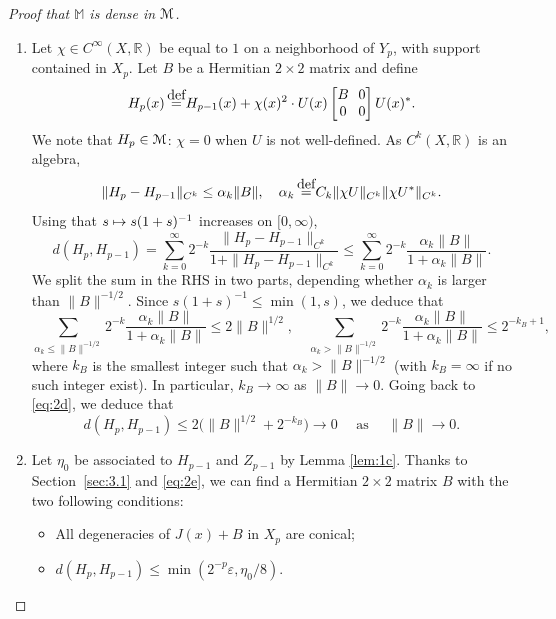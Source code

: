 \documentclass[11pt]{article}
\numberwithin{equation}{section}
\let\pazocal\EuScript
\def\mto{\mathchoice{\longmapsto}{\mapsto}{\mapsto}{\mapsto}}
\theoremstyle{definition}
\newcommand{\MM}{\pazocal{M}}
\newcommand{\R}{\mathbb{R}}
\newcommand{\Mm}{\mathbb{M}}
\let\az\alpha
\let\epsi\varepsilon
\newcommand{\matrice}[1]{\arraycolsep3.5pt\begin{bmatrix}#1\end{bmatrix}}
\newcommand{\de}{\,\mathrel{\stackrel{\makebox[0pt]{\mbox{\normalfont\tiny def}}}{=}}}
\begin{document}
\begin{proof}[Proof that $\Mm$ is dense in $\MM$]
\begin{enumerate}
\item
Let $\chi \in C^\infty(X,\R)$ be equal to $1$ on a neighborhood of $Y_p$, with support contained in $X_p$. Let $B$ be a Hermitian $2 \times 2$ matrix and define
\begin{equation}\label{eq:1r}
H_p(x) \de H_{p-1}(x) + \chi(x)^2 \cdot U(x) \matrice{ B & 0 \\ 0 & 0}U(x)^*.
\end{equation}
We note that
$H_p \in \MM$: $\chi = 0$ when $U$ is not well-defined. As $C^k(X,\R)$ is an algebra,
\begin{equation*}
\| H_p-H_{p-1} \|_{C^k} \leq \az_k \|B\|, \quad \az_k \de C_k \| \chi U \|_{C^k} \| \chi U^* \|_{C^k}.
\end{equation*}
Using that $s \mto s(1+s)^{-1}$ increases on $[0,\infty)$,
\begin{equation}\label{eq:2d}
d(H_p,H_{p-1}) = \sum_{k=0}^\infty 2^{-k} \dfrac{\| H_p-H_{p-1} \|_{C^k} }{1+\| H_p - H_{p-1}\|_{C^k}} \leq \sum_{k=0}^\infty 2^{-k} \dfrac{\az_k \|B\| }{1+\az_k \|B\|}.
\end{equation}
We split the sum in the RHS in two parts, depending whether $\az_k$ is larger than $\|B\|^{-1/2}$. Since $s(1+s)^{-1} \leq \min(1,s)$, we deduce that
\begin{equation*}
\sum_{\az_k \leq \|B\|^{-1/2} } 2^{-k} \dfrac{\az_k \|B\| }{1+\az_k \|B\|} \leq 2\|B\|^{1/2}, \quad \sum_{\az_k > \|B\|^{-1/2} } 2^{-k} \dfrac{\az_k \|B\| }{1+\az_k \|B\|} \leq 2^{-k_B+1},
\end{equation*}
where $k_B$ is the smallest integer such that $\az_k > \| B \|^{-1/2}$ (with $k_B = \infty$ if no such integer exist). In particular, $k_B \to \infty$ as $\| B \| \to 0$. Going back to \eqref{eq:2d}, we deduce that
\begin{equation}\label{eq:2e}
d(H_p,H_{p-1}) \leq 2 \bigl(\| B \|^{1/2} + 2^{-k_B}\bigr) \to 0 \quad \text{ as } \quad \| B \| \to 0.
\end{equation}

\item
Let $\eta_0$ be associated to $H_{p-1}$ and $Z_{p-1}$ by Lemma \ref{lem:1c}.
Thanks to Section~\ref{sec:3.1} and \eqref{eq:2e}, we can find a Hermitian $2 \times 2$ matrix $B$ with the two following conditions:
\begin{itemize}
\item All degeneracies of $J(x) + B$ in $X_p$ are conical;
\item $d(H_p,H_{p-1}) \leq \min\left(2^{-p} \epsi,\eta_0/8\right)$.
\end{itemize}


\end{enumerate}
\end{proof}
\end{document}
